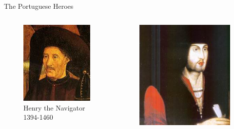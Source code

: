 \documentclass{beamer}
\begin{document}
\begin{frame}{The Portuguese Heroes}

\begin{columns}
	\begin{figure}[ht]
	\begin{center}
	\includegraphics[width=0.9 \columnwidth]{Henry.jpg}
	\caption{\tiny Henry the Navigator 1394-1460}	 %
	\end{center}
	\end{figure}
	\begin{figure}[ht]
	\begin{center}
	\includegraphics[width=0.9 \columnwidth]{JohnII.jpg}

\end{center}
\end{figure}
\end{columns}
\end{frame}
\end{document}
